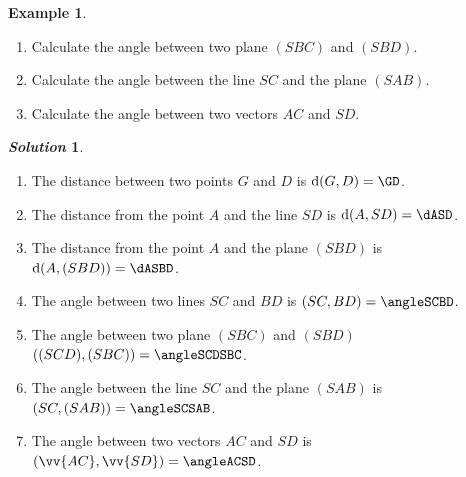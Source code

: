 \documentclass[12pt]{article}
\theoremstyle{definition}
\newtheorem{EX}{Example}
\newtheorem*{sol}{\textit{\textbf{Solution}}}
\begin{document}
\begin{EX}
\begin{enumerate}[label=\arabic*)]
  \item Calculate the angle between two plane $(SBC)$ and $(SBD)$.
  \item Calculate the angle between the line $SC$ and the plane $(SAB)$.
  \item Calculate the angle between two vectors $AC$ and  $SD$.
\end{enumerate}
\begin{sol}
\mbox{}
\begin{enumerate}[label=\arabic*)]
  \item The distance between two points $G$ and $D$ is $\mathrm d(G,D) = \GD$.
  \item The distance from the point $A$ and the line $SD$ is $\mathrm d(A, SD) = \dASD$.
  \item The distance from the point $A$ and the plane $(SBD)$ is $\mathrm d(A,(SBD)) = \dASBD$.
  \item The angle between two lines $SC$ and $BD$ is $(SC,BD) = \angleSCBD$.
  \item The angle between two plane $(SBC)$ and $(SBD)$ $((SCD),(SBC)) = \angleSCDSBC$.
\item The angle between the line $SC$ and the plane $(SAB)$ is $(SC,(SAB)) = \angleSCSAB$.
 \item   The angle between two vectors $AC$ and  $SD$ is $(\vv{AC},\vv{SD}) = \angleACSD$.
\end{enumerate}
\end{sol}
\end{EX}
\end{document}

